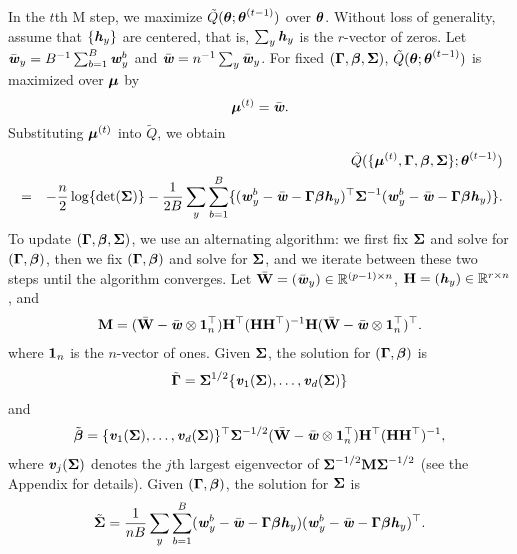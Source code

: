 \documentclass[12pt]{article}
\def \bfith{\mbox{\textbf{\textit{h}}}}
\def \bfitv{\mbox{\textbf{\textit{v}}}}
\def \bfitw{\mbox{\textbf{\textit{w}}}}
\def \bfbeta{\mbox{\boldmath $\beta$}}
\def \bfmu{\mbox{\boldmath $\mu$}}
\def \bftheta{\mbox{\boldmath $\theta$}}
\def \M{\mathbf{M}}
\def \H{\mathbf{H}}
\def \W{\mathbf{W}}
\def \bfGamma{\mbox{\boldmath $\Gamma$}}
\def \bfSigma{\mbox{\boldmath $\Sigma$}}
\begin{document}
In the $t$th M step, we maximize $\tilde{Q}(\bftheta; \bftheta^{(t - 1)})$ over $\bftheta$. Without loss of generality, assume that $\{\bfith_y\}$ are centered, that is, $\sum_{y} \bfith_y$ is the $r$-vector of zeros. Let $\bar{\bfitw}_y = B^{-1}\sum_{b = 1}^B\bfitw_y^b$ and $\bar{\bfitw} = n^{-1} \sum_{y} \bar{\bfitw}_y$. For fixed $(\bfGamma, \bfbeta, \bfSigma)$, $\tilde{Q}(\bftheta; \bftheta^{(t - 1)})$ is maximized over $\bfmu$ by
$$\bfmu^{(t)} = \bar{\bfitw}.$$
Substituting $\bfmu^{(t)}$ into $\tilde{Q}$, we obtain
\begin{eqnarray}
\nonumber
&&\tilde{Q}(\{\bfmu^{(t)}, \bfGamma, {\bfbeta}, \bfSigma\}; \bftheta^{(t - 1)}) \\ \nonumber
&=& - \frac{n}{2}\log\{\operatorname{det}(\bfSigma)\} - \frac{1}{2B}\sum_{y} \sum_{b = 1}^{B}\{(\bfitw_{y}^{b} - \bar{\bfitw} - \bfGamma{\bfbeta} \bfith_y)^{\top} \bfSigma^{-1} (\bfitw_{y}^{b} - \bar{\bfitw} - \bfGamma {\bfbeta} \bfith_y)\}.
\end{eqnarray}
To update $(\bfGamma, \bfbeta, \bfSigma)$, we use an alternating algorithm: we first fix $\bfSigma$ and solve for $(\bfGamma, \bfbeta)$, then we fix $(\bfGamma, \bfbeta)$ and solve for $\bfSigma$, and we iterate between these two steps until the algorithm converges. Let $\bar{\W} = (\bar{\bfitw}_y) \in \mathbb{R}^{(p - 1) \times n}$, $\H = (\bfith_y) \in \mathbb{R}^{r \times n}$, and
\begin{eqnarray*}
\M = (\bar{\W} - \bar{\bfitw} \otimes {\bf 1}_n^{\top}) \H^{\top} (\H\H^{\top})^{-1} \H (\bar{\W} - \bar{\bfitw} \otimes {\bf 1}_n^{\top})^{\top}.
\end{eqnarray*}
where ${\bf 1}_n$ is the $n$-vector of ones. Given $\bfSigma$, the solution for $(\bfGamma, \bfbeta)$ is
\begin{eqnarray}\label{update_gamma}
\tilde{\bfGamma} = \bfSigma^{1/2} \{\bfitv_1(\bfSigma), \ldots, \bfitv_d(\bfSigma)\}
\end{eqnarray}
and
\begin{eqnarray}\label{update_beta}
\tilde{\bfbeta} %
= \{\bfitv_1(\bfSigma), \ldots, \bfitv_d(\bfSigma)\}^{\top} \bfSigma^{-1/2} (\bar{\W} - \bar{\bfitw} \otimes {\bf 1}_n^{\top}) \H^{\top} (\H\H^{\top})^{-1},
\end{eqnarray}
where $\bfitv_j(\bfSigma)$ denotes the $j$th largest eigenvector of $\bfSigma^{-1/2} \M \bfSigma^{-1/2}$ (see the Appendix for details). Given $(\bfGamma, \bfbeta)$, the solution for $\bfSigma$ is
 \begin{eqnarray*}
\tilde{\bfSigma} = \frac{1}{n B}\sum_{y} \sum_{b = 1}^{B}(\bfitw_{y}^{b} - \bar{\bfitw} - \bfGamma\bfbeta \bfith_y) (\bfitw_{y}^{b} - \bar{\bfitw} - \bfGamma\bfbeta \bfith_y)^{\top}.
\end{eqnarray*}
\end{document}
